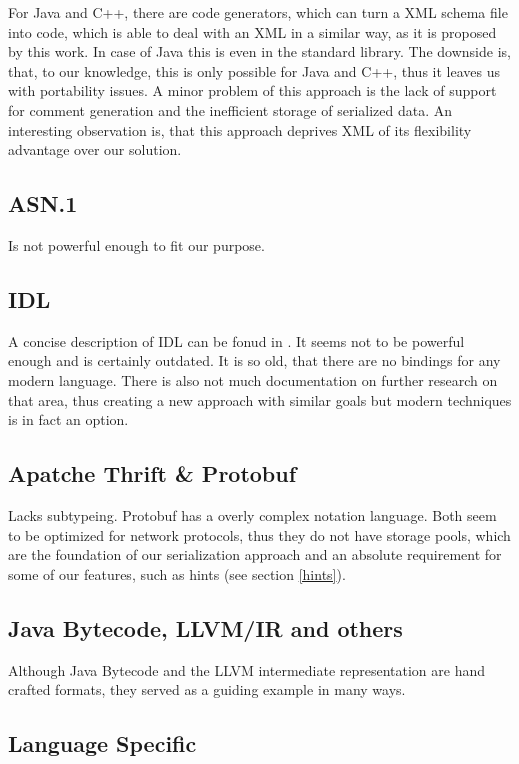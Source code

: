 For Java and C++, there are code generators, which can turn a XML schema file into code, which is able to deal with an XML in a similar way, as it is proposed by this work. In case of Java this is even in the standard library. The downside is, that, to our knowledge, this is only possible for Java and C++, thus it leaves us with portability issues. A minor problem of this approach is the lack of support for comment generation and the inefficient storage of serialized data.
An interesting observation is, that this approach deprives XML of its flexibility advantage over our solution. 


\subsection*{ASN.1}

Is not powerful enough to fit our purpose.

\subsection*{IDL}

A concise description of IDL can be fonud in . It seems not to be powerful enough and is certainly outdated. It is so old, that there are no bindings for any modern language. There is also not much documentation on further research on that area, thus creating a new approach with similar goals but modern techniques is in fact an option.


\subsection*{Apatche Thrift \& Protobuf}

Lacks subtypeing. Protobuf has a overly complex notation language. Both seem to be optimized for network protocols, thus they do not have storage pools, which are the foundation of our serialization approach and an absolute requirement for some of our features, such as hints (see section \ref{hints}).


\subsection*{Java Bytecode, LLVM/IR and others}

Although Java Bytecode and the LLVM intermediate representation are hand crafted formats, they served as a guiding example in many ways.


\subsection*{Language Specific}

